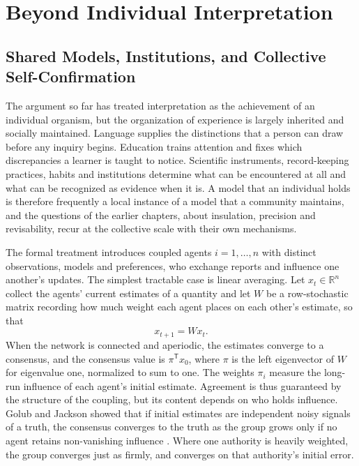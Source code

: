 \part{Beyond Individual Interpretation}

\chapter{Shared Models, Institutions, and Collective Self-Confirmation}

The argument so far has treated interpretation as the achievement of an individual organism, but the organization of experience is largely inherited and socially maintained. Language supplies the distinctions that a person can draw before any inquiry begins. Education trains attention and fixes which discrepancies a learner is taught to notice. Scientific instruments, record-keeping practices, habits and institutions determine what can be encountered at all and what can be recognized as evidence when it is. A model that an individual holds is therefore frequently a local instance of a model that a community maintains, and the questions of the earlier chapters, about insulation, precision and revisability, recur at the collective scale with their own mechanisms.

The formal treatment introduces coupled agents $i=1,\dots,n$ with distinct observations, models and preferences, who exchange reports and influence one another's updates. The simplest tractable case is linear averaging. Let $x_t\in\mathbb{R}^n$ collect the agents' current estimates of a quantity and let $W$ be a row-stochastic matrix recording how much weight each agent places on each other's estimate, so that
\[
x_{t+1}=Wx_t .
\]
When the network is connected and aperiodic, the estimates converge to a consensus, and the consensus value is $\pi^{\mathsf T}x_0$, where $\pi$ is the left eigenvector of $W$ for eigenvalue one, normalized to sum to one. The weights $\pi_i$ measure the long-run influence of each agent's initial estimate. Agreement is thus guaranteed by the structure of the coupling, but its content depends on who holds influence. Golub and Jackson showed that if initial estimates are independent noisy signals of a truth, the consensus converges to the truth as the group grows only if no agent retains non-vanishing influence \citep{golub2010}. Where one authority is heavily weighted, the group converges just as firmly, and converges on that authority's initial error.

